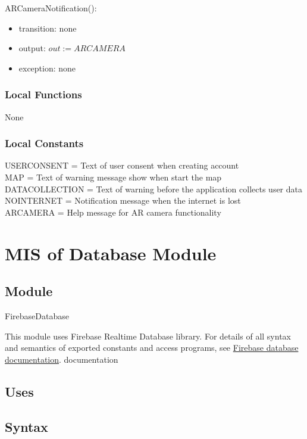 \documentclass[12pt, titlepage]{article}
\begin{document}
\noindent ARCameraNotification():
\begin{itemize}
\item transition: none
\item output: $out := ARCAMERA$
\item exception: none
\end{itemize}

\subsubsection{Local Functions}

None

\subsubsection{Local Constants}
USERCONSENT = Text of user consent when creating account\\
MAP = Text of warning message show when start the map\\
DATACOLLECTION = Text of warning before the application collects user data\\
NOINTERNET = Notification message when the internet is lost\\
ARCAMERA =  Help message for AR camera functionality\\

\newpage

\section{MIS of Database Module} \label{mDB}

\subsection{Module}

FirebaseDatabase

\noindent This module uses Firebase Realtime Database library. For details of all syntax and semantics of exported constants and access programs, see \href{https://firebase.google.com/docs/reference/unity/namespace/firebase/database}{Firebase database documentation}.
documentation
\subsection{Uses}

\subsection{Syntax}
\end{document}
